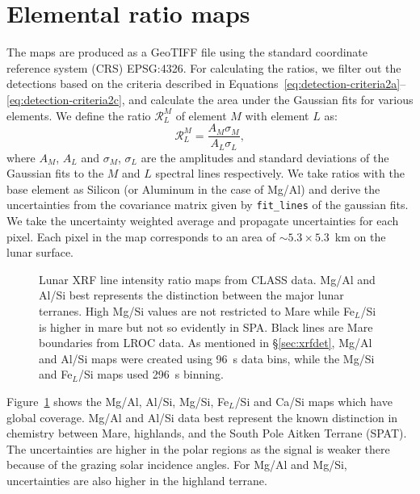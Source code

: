 \documentclass[twocolumn,linenumbers]{aastex631}
\newcommand{\revone}[1]{#1}
\begin{document}
\section{Elemental ratio maps}\label{sec:mapping}

The maps are produced as a GeoTIFF file using the standard coordinate reference system (CRS) EPSG:4326. For calculating the ratios, we filter out the detections based on the criteria described in Equations~\ref{eq:detection-criteria2a}--\ref{eq:detection-criteria2c}, and calculate the area under the Gaussian fits for various elements. We define the ratio $\mathcal{R}^M_L$ of element $M$ with element $L$ as:
\begin{equation}
    \mathcal{R}^{M}_{L} = \dfrac{A_M \sigma_M}{A_L \sigma_L} ,
\end{equation}
where $A_M$, $A_L$ and $\sigma_M$, $\sigma_L$ are the amplitudes and standard deviations of the Gaussian fits to the $M$ and $L$ spectral lines respectively.
We take ratios with the base element as Silicon \revone{(or Aluminum in the case of Mg/Al)} and derive the uncertainties from the covariance matrix given by \texttt{fit\_lines} of the gaussian fits. We take the uncertainty weighted average and propagate uncertainties for each pixel. Each pixel in the map corresponds to an area of $\sim$$5.3\times 5.3$~km on the lunar surface. 

\begin{figure}
    \vspace{-25pt}
    \vspace{-25pt}
    \vspace{-25pt}
    \vspace{-25pt}
    \caption{Lunar XRF line intensity ratio maps from CLASS data. Mg/Al and Al/Si best represents the distinction between the major lunar terranes. High Mg/Si values are not restricted to Mare while Fe$_L$/Si is higher in mare but not so evidently in SPA. Black lines are Mare boundaries from LROC data. As mentioned in \S\ref{sec:xrfdet}, Mg/Al and Al/Si maps were created using 96~s data bins, while the Mg/Si and Fe$_L$/Si maps used 296~s binning.}
    \label{fig:maps1}
\end{figure}

Figure~\ref{fig:maps1} shows the Mg/Al, Al/Si, Mg/Si,  Fe$_L$/Si and Ca/Si maps which have global coverage. Mg/Al and Al/Si data best represent the known distinction in chemistry between Mare, highlands, and the South Pole Aitken Terrane (SPAT). The uncertainties are higher in the polar regions as the signal is weaker there because of the grazing solar incidence angles. For Mg/Al and Mg/Si, uncertainties are also higher in the highland terrane.
\end{document}

